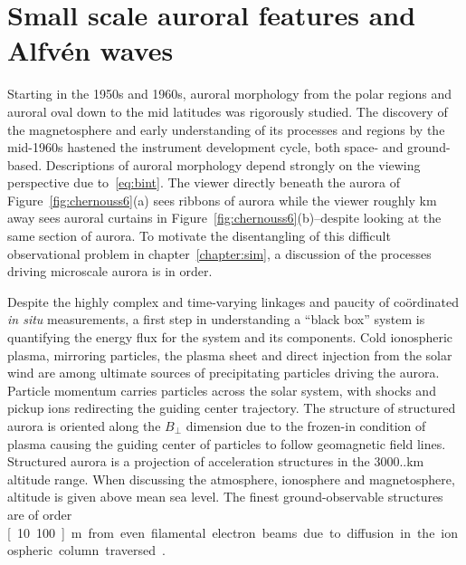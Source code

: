 \section{Small scale auroral features and Alfvén waves}
Starting in the 1950s and 1960s, auroral morphology from the polar regions and auroral oval down to the mid latitudes \citep{akasofu1963} was rigorously studied.
The discovery of the magnetosphere and early understanding of its processes and regions by the mid-1960s hastened the instrument development cycle, both space- and ground-based.
Descriptions of auroral morphology depend strongly on the viewing perspective due to~\eqref{eq:bint}.
The viewer directly beneath the aurora of Figure~\ref{fig:chernouss6}(a) sees ribbons of aurora while the viewer roughly \unit[100]{km} away sees auroral curtains in Figure~\ref{fig:chernouss6}(b)--despite looking at the same section of aurora.
To motivate the disentangling of this difficult observational problem in chapter~\ref{chapter:sim}, a discussion of the processes driving microscale aurora is in order.

Despite the highly complex and time-varying linkages and paucity of coördinated \textit{in situ} measurements, a first step in understanding a ``black box'' system is quantifying the energy flux for the system and its components.
Cold ionospheric plasma, mirroring particles, the plasma sheet and direct injection from the solar wind are among  ultimate sources of precipitating particles driving the aurora.
Particle momentum carries particles across the solar system, with shocks and pickup ions redirecting the guiding center trajectory.
The structure of structured aurora is oriented along the $B_\perp$ dimension due to the frozen-in condition of plasma causing the guiding center of particles to follow geomagnetic field lines.
Structured aurora is a projection of acceleration structures in the 3000..\unit[10000]{km} altitude range.
When discussing the atmosphere, ionosphere and magnetosphere, altitude is given above mean sea level.
The finest ground-observable structures are of order \unit[10..100]{m} from even filamental electron beams due to diffusion in the ionospheric column traversed \citep{borovsky1993}.

